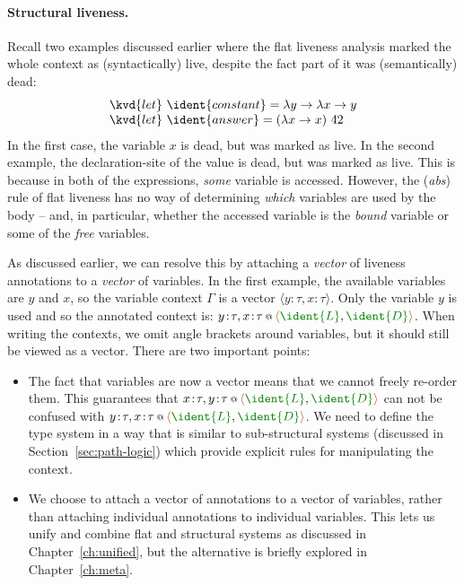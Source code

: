 \paragraph{Structural liveness.} 
Recall two examples discussed earlier where the flat liveness analysis marked the whole context
as (syntactically) live, despite the fact part of it was (semantically) dead:
%
\begin{equation*}
\begin{array}{l}
\kvd{let}~\ident{constant} = \lambda y \rightarrow \lambda x \rightarrow y\\
\kvd{let}~\ident{answer} = (\lambda x \rightarrow x)~42
\end{array}
\end{equation*}
%
In the first case, the variable $x$ is dead, but was marked as live. In the second example, the
declaration-site of the  value is dead, but was marked as live. This is because in 
both of the expressions, \emph{some} variable is accessed. However, the (\emph{abs}) rule of flat
liveness has no way of determining \emph{which} variables are used by the body -- and, in particular,
whether the accessed variable is the \emph{bound} variable or some of the \emph{free} variables.

As discussed earlier, we can resolve this by attaching a \emph{vector} of liveness annotations to
a \emph{vector} of variables. In the first example, the available variables are $y$ and $x$, so
the variable context $\Gamma$ is a vector $\langle y\!:\!\tau, x\!:\!\tau \rangle$. Only the variable $y$
is used and so the annotated context is: $\coctx{y\!:\!\tau, x\!:\!\tau}{ \alift{\cclrd{\ident{L}}, \cclrd{\ident{D}}} }$.
When writing the contexts, we omit angle brackets around variables, but it should still be viewed
as a vector. There are two important points:

\begin{itemize}
\item The fact that variables are now a vector means that we cannot freely re-order them. This
  guarantees that $\coctx{x\!:\!\tau, y\!:\!\tau}{\alift{\cclrd{\ident{L}}, \cclrd{\ident{D}}}}$
  can not be confused with $\coctx{y\!:\!\tau, x\!:\!\tau}{\alift{\cclrd{\ident{L}}, \cclrd{\ident{D}}}}$.
  We need to define the type system in a way that is similar to sub-structural systems 
  (discussed in Section~\ref{sec:path-logic}) which provide explicit rules for manipulating
  the context. 

\item We choose to attach a vector of annotations to a vector of variables, rather than attaching
  individual annotations to individual variables. This lets us unify and combine flat and 
  structural systems as discussed in Chapter~\ref{ch:unified}, but the alternative is briefly
  explored in Chapter~\ref{ch:meta}.
\end{itemize}

